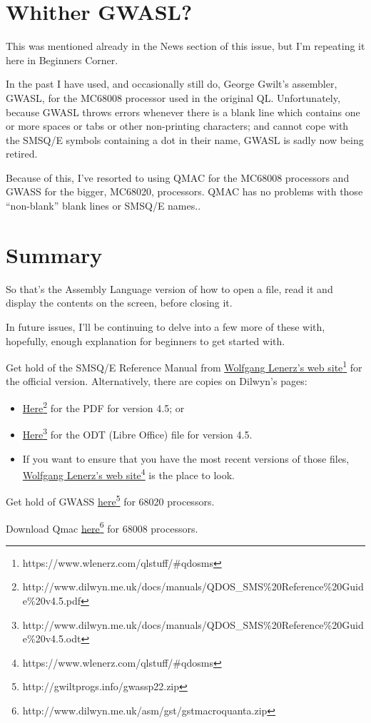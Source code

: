 \section{Whither GWASL?}

This was mentioned already in the News section of this issue, but
I'm repeating it here in Beginners Corner.

In the past I have used, and occasionally still do, George Gwilt's
assembler, GWASL, for the MC68008 processor used in the original QL.
Unfortunately, because GWASL throws errors whenever there is a blank
line which contains one or more spaces or tabs or other non-printing
characters; and cannot cope with the SMSQ/E symbols containing a dot
in their name, GWASL is sadly now being retired.

Because of this, I've resorted to using QMAC for the MC68008 processors
and GWASS for the bigger, MC68020, processors. QMAC has no problems
with those ``non-blank'' blank lines or SMSQ/E names..

\section{Summary}

So that's the Assembly Language version of how to open a file, read
it and display the contents on the screen, before closing it.

In future issues, I'll be continuing to delve into a few more of these
with, hopefully, enough explanation for beginners to get started with.

Get hold of the SMSQ/E Reference Manual from \href{https://www.wlenerz.com/qlstuff/\#qdosms}{Wolfgang Lenerz's web site}\footnote{https://www.wlenerz.com/qlstuff/\#qdosms}
for the official version. Alternatively, there are copies on Dilwyn's
pages:
\begin{itemize}
\item \href{http://www.dilwyn.me.uk/docs/manuals/QDOS_SMS\%20Reference\%20Guide\%20v4.5.pdf}{Here}\footnote{http://www.dilwyn.me.uk/docs/manuals/QDOS\_SMS\%20Reference\%20Guide\%20v4.5.pdf}
for the PDF for version 4.5; or
\item \href{http://www.dilwyn.me.uk/docs/manuals/QDOS_SMS\%20Reference\%20Guide\%20v4.5.odt}{Here}\footnote{http://www.dilwyn.me.uk/docs/manuals/QDOS\_SMS\%20Reference\%20Guide\%20v4.5.odt}
for the ODT (Libre Office) file for version 4.5.
\item If you want to ensure that you have the most recent versions of those
files, \href{https://www.wlenerz.com/qlstuff/\#qdosms}{Wolfgang Lenerz's web site}\footnote{https://www.wlenerz.com/qlstuff/\#qdosms}
is the place to look.
\end{itemize}
Get hold of GWASS \href{http://gwiltprogs.info/gwassp22.zip}{here}\footnote{http://gwiltprogs.info/gwassp22.zip}
for 68020 processors.

Download Qmac \href{http://www.dilwyn.me.uk/asm/gst/gstmacroquanta.zip}{here}\footnote{http://www.dilwyn.me.uk/asm/gst/gstmacroquanta.zip}
for 68008 processors.
